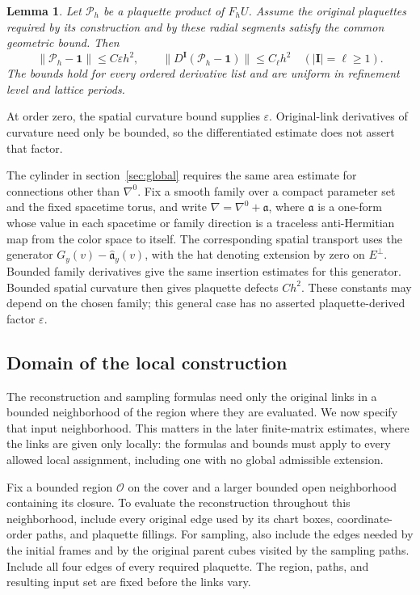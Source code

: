 \documentclass[11pt,a4paper]{article}
\newtheorem{lemma}[theorem]{Lemma}
\theoremstyle{remark}
\newcommand{\Id}{\mathbf 1}
\newcommand{\eps}{\varepsilon}
\begin{document}
\begin{lemma}
\label{app:g:plaquette-derivatives}
Let $\mathcal P_h$ be a plaquette product of $F_hU$. Assume the
original plaquettes required by its construction and by these radial
segments satisfy the common geometric bound. Then
\begin{equation}
 \|\mathcal P_h-\Id\|\le C\eps h^2,\qquad
 \|D^{\boldsymbol I}(\mathcal P_h-\Id)\|\le C_{\ell}h^2
 \quad(|\boldsymbol I|=\ell\ge1).
 \label{app:g:plaquette-jets}
\end{equation}
The bounds hold for every ordered derivative list and are uniform in
refinement level and lattice periods.
\end{lemma}
At order zero, the spatial curvature bound supplies $\eps$.
Original-link derivatives of curvature need only be bounded, so the
differentiated estimate does not assert that factor.

The cylinder in section~\ref{sec:global} requires the same area
estimate for connections other than $\nabla^0$. Fix a smooth family
over a compact parameter set and the fixed spacetime torus, and write
$\nabla=\nabla^0+\mathfrak a$, where $\mathfrak a$ is a
one-form whose value in each spacetime or family direction is a traceless
anti-Hermitian map from the color space to itself. The corresponding
spatial transport uses the generator
$G_y(v)-\widehat{\mathfrak a}_y(v)$, with the hat denoting
extension by zero on $E^\perp$. Bounded family derivatives give
the same insertion estimates for this generator. Bounded spatial
curvature then gives plaquette defects $Ch^2$. These constants may
depend on the chosen family; this general case has no asserted
plaquette-derived factor $\eps$.

\subsection{Domain of the local construction}
\label{app:g:local-domain}

The reconstruction and sampling formulas need only the original links
in a bounded neighborhood of the region where they are evaluated. We
now specify that input neighborhood. This matters in the later
finite-matrix estimates, where the links are given only locally: the
formulas and bounds must apply to every allowed local assignment,
including one with no global admissible extension.

Fix a bounded region $\mathcal O$ on the cover and a larger bounded
open neighborhood containing its closure. To evaluate the reconstruction
throughout this neighborhood, include every original edge used by its
chart boxes, coordinate-order paths, and plaquette fillings. For
sampling, also include the edges needed by the initial frames and by
the original parent cubes visited by the sampling paths. Include all
four edges of every required plaquette. The region, paths, and resulting
input set are fixed before the links vary.
\end{document}

